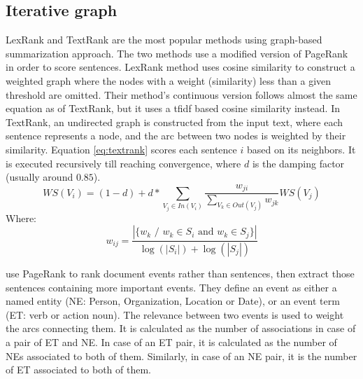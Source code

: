 \subsection{Iterative graph}

LexRank \citep{04-erkan-radev} and TextRank \citep{04-mihalcea-tarau} are the most popular methods using graph-based summarization approach. 
The two methods use a modified version of PageRank \citep{98-brin-page} in order to score sentences. 
%
LexRank method \citep{04-erkan-radev} uses cosine similarity to construct a weighted graph where the nodes with a weight (similarity) less than a given threshold are omitted. 
Their method's continuous version follows almost the same equation as of TextRank, but it uses a \ac{tfidf} based cosine similarity instead.
%
In TextRank, an undirected graph is constructed from the input text, where each sentence represents a node, and the arc between two nodes is weighted by their similarity. 
Equation \ref{eq:textrank} scores each sentence $ i $ based on its neighbors.
It is executed recursively till reaching convergence, where $ d $ is the damping factor (usually around $ 0.85 $).
\begin{equation}
	\label{eq:textrank}
	WS(V_i) = ( 1 - d) + d * \sum\limits_{V_j \in In(V_i)} \frac{w_{ji}}{\sum\limits_{V_k \in Out(V_j)} w_{jk}} WS(V_j)
\end{equation}
Where:
\begin{equation}
	\label{eq:textrank-sim}
	w_{ij} = \frac{|\{w_k \text{ / } w_k \in S_i \text{ and } w_k \in S_j\}|}{\log(|S_i|) + \log(|S_j|)}
\end{equation}

\citet{06-li-al} use PageRank to rank document events rather than sentences, then extract those sentences containing more important events.
They define an event as either a named entity (NE: Person, Organization, Location or Date), or an event term (ET: verb or action noun).
The relevance between two events is used to weight the arcs connecting them.
It is calculated as the number of associations in case of a pair of ET and NE.
In case of an ET pair, it is calculated as the number of NEs associated to both of them. 
Similarly, in case of an NE pair, it is the number of ET associated to both of them. 

